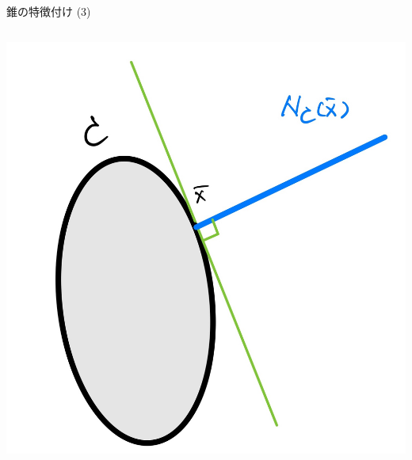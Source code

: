 \documentclass[aspectratio=169, dvipdfmx, 11pt]{beamer} %
\begin{document}
\begin{frame}{錐の特徴付け (3)}
\begin{columns}
\begin{column}{0.48\textwidth}
      \includegraphics[keepaspectratio, scale=0.06]{figures/normal_cone_2.jpg}
    \end{column}
  \end{columns}
\end{frame}
\end{document}
